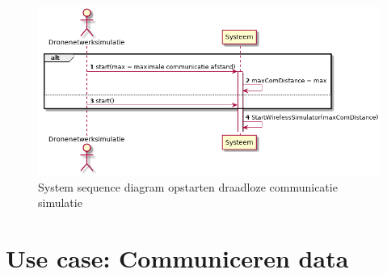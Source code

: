 \documentclass[a4paper, 11pt, oneside]{report}
\begin{document}
\begin{figure}[H]
	\begin{center}\includegraphics[height=.3\textheight]{UML/out/usecase/sequence/Simulerendraadlozecommunicatie/Simulerendraadlozecommunicatie.png}\end{center}
	\caption{System sequence diagram opstarten draadloze communicatie simulatie}
	\label{fig:simmulatiecommuicatie:systemsequence}
\end{figure}

\section[Communiceren data]{Use case: Communiceren data}
\label{Usecase:communicerendata}
\end{document}
